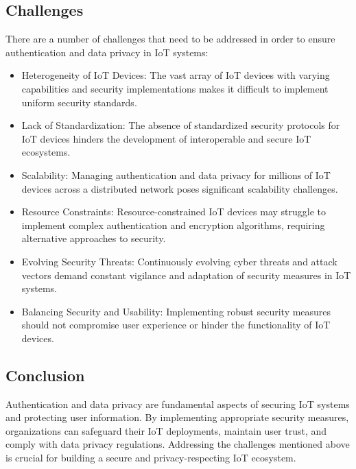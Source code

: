 \documentclass[conference]{IEEEtran}
\begin{document}
\subsection{Challenges}

There are a number of challenges that need to be addressed in order to ensure authentication and data privacy in IoT systems:

\begin{itemize}
    \item Heterogeneity of IoT Devices: The vast array of IoT devices with varying capabilities and security implementations makes it difficult to implement uniform security standards.
    \item Lack of Standardization: The absence of standardized security protocols for IoT devices hinders the development of interoperable and secure IoT ecosystems.
    \item Scalability: Managing authentication and data privacy for millions of IoT devices across a distributed network poses significant scalability challenges.
    \item Resource Constraints: Resource-constrained IoT devices may struggle to implement complex authentication and encryption algorithms, requiring alternative approaches to security.
    \item Evolving Security Threats: Continuously evolving cyber threats and attack vectors demand constant vigilance and adaptation of security measures in IoT systems.
    \item Balancing Security and Usability: Implementing robust security measures should not compromise user experience or hinder the functionality of IoT devices.
\end{itemize}

\subsection{Conclusion}

Authentication and data privacy are fundamental aspects of securing IoT systems and protecting user information. By implementing appropriate security measures, organizations can safeguard their IoT deployments, maintain user trust, and comply with data privacy regulations. Addressing the challenges mentioned above is crucial for building a secure and privacy-respecting IoT ecosystem.
\end{document}
